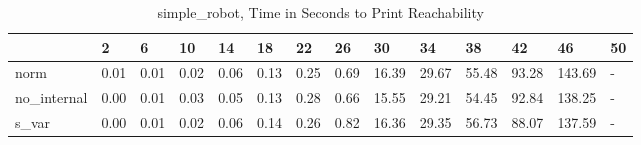 \begin{table}
\caption{simple_robot, Time in Seconds to Print Reachability}
\label{simple_robot_states_time}
\begin{tabular}{llllllllllllll}
\toprule
 & 2 & 6 & 10 & 14 & 18 & 22 & 26 & 30 & 34 & 38 & 42 & 46 & 50 \\
\midrule
norm & 0.01 & 0.01 & 0.02 & 0.06 & 0.13 & 0.25 & 0.69 & 16.39 & 29.67 & 55.48 & 93.28 & 143.69 & - \\
no_internal & 0.00 & 0.01 & 0.03 & 0.05 & 0.13 & 0.28 & 0.66 & 15.55 & 29.21 & 54.45 & 92.84 & 138.25 & - \\
s_var & 0.00 & 0.01 & 0.02 & 0.06 & 0.14 & 0.26 & 0.82 & 16.36 & 29.35 & 56.73 & 88.07 & 137.59 & - \\
\bottomrule
\end{tabular}
\end{table}
